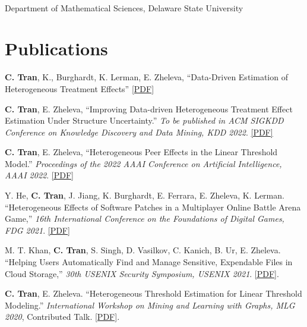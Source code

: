 \documentclass[mm]{simple_style}
\begin{document}
\begin{resume}
	\\
	Department of Mathematical Sciences, Delaware State University 
	
	\vspace{-2ex}
	\sectionline
	
	\section{Publications}
	
	\textbf{C. Tran}, K., Burghardt, K. Lerman, E. Zheleva, ``Data-Driven Estimation of Heterogeneous Treatment Effects'' \href{https://arxiv.org/pdf/2301.06615.pdf}{[PDF]}
	
	\textbf{C. Tran}, E. Zheleva, ``Improving Data-driven Heterogeneous Treatment Effect Estimation Under Structure Uncertainty.'' \textit{To be published in ACM SIGKDD Conference on Knowledge Discovery and Data Mining, \textcolor{dorange}{KDD 2022}}. \href{https://dl.acm.org/doi/pdf/10.1145/3534678.3539444}{[PDF]}
	
	\textbf{C. Tran}, E. Zheleva, ``Heterogeneous Peer Effects in the Linear Threshold Model.'' \textit{Proceedings of the 2022 AAAI Conference on Artificial Intelligence, \textcolor{dorange}{AAAI 2022}}. \href{https://ojs.aaai.org/index.php/AAAI/article/view/20336/20095}{[PDF]}
	
	Y. He, \textbf{C. Tran}, J. Jiang, K. Burghardt, E. Ferrara, E. Zheleva, K. Lerman. ``Heterogeneous Effects of Software Patches in a Multiplayer Online Battle Arena Game,'' \textit{16th International Conference on the Foundations of Digital Games, \textcolor{dorange}{FDG 2021}}. \href{https://dl.acm.org/doi/pdf/10.1145/3472538.3472550}{[PDF]}
	
	M. T. Khan, \textbf{C. Tran}, S. Singh, D. Vasilkov, C. Kanich, B. Ur, E. Zheleva. ``Helping Users Automatically Find and Manage Sensitive, Expendable Files in Cloud Storage,'' \textit{30th USENIX Security Symposium, \textcolor{dorange}{USENIX 2021}}. \href{https://www.cs.uic.edu/~ctran/docs/khan-usenix2021.pdf}{[PDF]}.
	
	\textbf{C. Tran}, E. Zheleva. ``Heterogeneous Threshold Estimation for Linear Threshold Modeling.'' \textit{International Workshop on Mining and Learning with Graphs, \textcolor{dorange}{MLG 2020}}, Contributed Talk. \href{http://www.mlgworkshop.org/2020/papers/MLG2020_paper_23.pdf}{[PDF]}.
	

\end{resume}
\end{document}
